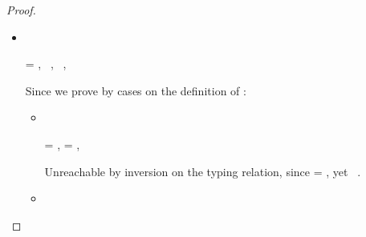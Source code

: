 \begin{lemma}
\begin{proof}
        \begin{itemize} %
          \item[]
            \begin{subcase}[\isaopsem{\val{1}}{\val{1}} = {\true{}}, \text{if} \val{1} \notequal\ {\class{}}]
              \ 

               = ,  \notequal\ {\class{}},  \notequal\ {\class{}}, \istrueval{\val{}}
              
              Since \istrueval{\val{}} we prove {\satisfies{\openv{}}{\thenprop{\prop{}}}}
              by cases on the definition of \isacompareliteral{}:
              \begin{itemize} %
                \item[]
                  \begin{subcase}[\isacompare{\s{}}{\pth{\classpe{}}{\pth{\pathelem{}}{\x{}}}}{\Value{\class{}}}
                                 {\filterset{\isprop{\class{}} {\pth{\pathelem{}}{\x{}}}}
                                            {\notprop{\class{}}{\pth{\pathelem{}}{\x{}}}}}]
                    \ 


                     = {\pth{\classpe{}}{\pth{\pathelem{}}{\x{}}}},
                     = {\Value{\class{}}},
                    \inpropenv{\isprop{\class{}} {\pth{\pathelem{}}{\x{}}}}{\thenprop{\prop{}}}

                    Unreachable by inversion on the typing relation, since  = {\Value{\class{}}},
                    yet  \notequal\ {\class{}}.

%
%
%

                  \end{subcase}
                \item[]
                  \begin{subcase}
                    \ 


\end{subcase}
\end{itemize}
\end{subcase}
\end{itemize}
\end{proof}
\end{lemma}
